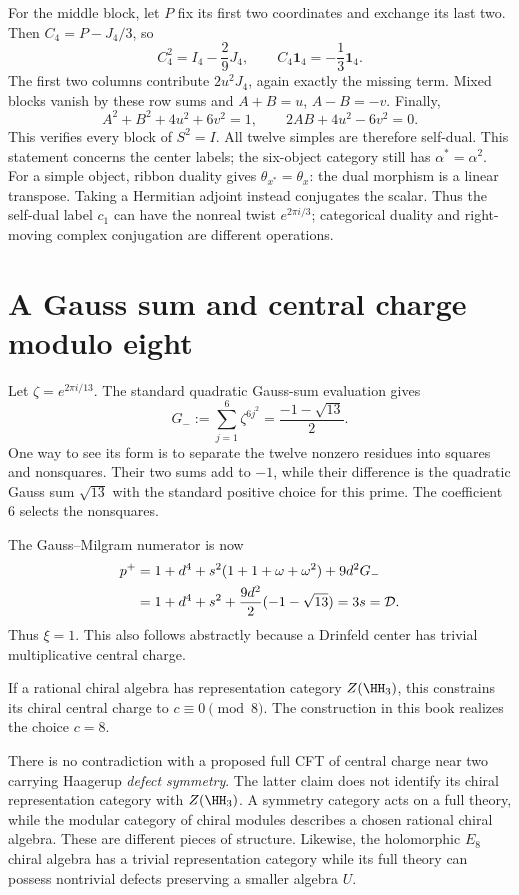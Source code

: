 For the middle block, let $P$ fix its first two coordinates and
exchange its last two.  Then $C_4=P-J_4/3$, so
\[
 C_4^2=I_4-\frac29J_4,
 \qquad C_4\mathbf1_4=-\frac13\mathbf1_4.
\]
The first two columns contribute $2u^2J_4$, again exactly the
missing term.  Mixed blocks vanish by these row sums and
$A+B=u$, $A-B=-v$.  Finally,
\[
 A^2+B^2+4u^2+6v^2=1,
 \qquad 2AB+4u^2-6v^2=0.
\]
This verifies every block of $S^2=I$.  All twelve simples are
therefore self-dual.  This statement concerns the center labels;
the six-object category still has $\alpha^*=\alpha^2$.
For a simple object, ribbon duality gives $\theta_{x^*}=\theta_x$:
the dual morphism is a linear transpose. Taking a Hermitian adjoint
instead conjugates the scalar. Thus the self-dual label $c_1$ can
have the nonreal twist $e^{2\pi i/3}$; categorical duality and
right-moving complex conjugation are different operations.

\section{A Gauss sum and central charge modulo eight}

Let $\zeta=e^{2\pi i/13}$.  The standard quadratic Gauss-sum
evaluation gives
\begin{equation}
 G_-:=\sum_{j=1}^6\zeta^{6j^2}
 =\frac{-1-\sqrt{13}}2.
 \label{eq:nonresidue-Gauss13}
\end{equation}
One way to see its form is to separate the twelve nonzero residues
into squares and nonsquares.  Their two sums add to $-1$, while
their difference is the quadratic Gauss sum $\sqrt{13}$ with
the standard positive choice for this prime.  The coefficient $6$
selects the nonsquares.

The Gauss--Milgram numerator is now
\begin{align}
 p^+&=1+d^4+s^2(1+1+\omega+\omega^2)
       +9d^2G_-\notag\\
 &=1+d^4+s^2+\frac{9d^2}{2}(-1-\sqrt{13})
 =3s=\mathcal D.
 \label{eq:H3-Gauss-Milgram}
\end{align}
Thus $\xi=1$.  This also follows abstractly because a Drinfeld
center has trivial multiplicative central charge.

If a rational chiral algebra has representation category
$Z(\HH_3)$, this constrains its chiral central charge to
$c\equiv0\pmod8$.  The construction in this book realizes the
choice $c=8$.

There is no contradiction with a proposed full CFT of central charge
near two carrying Haagerup \emph{defect symmetry}.  The latter claim
does not identify its chiral representation category with
$Z(\HH_3)$.  A symmetry category acts on a full theory, while
the modular category of chiral modules describes a chosen rational
chiral algebra.  These are different pieces of structure.  Likewise,
the holomorphic $E_8$ chiral algebra has a trivial representation
category while its full theory can possess nontrivial defects
preserving a smaller algebra $U$.

